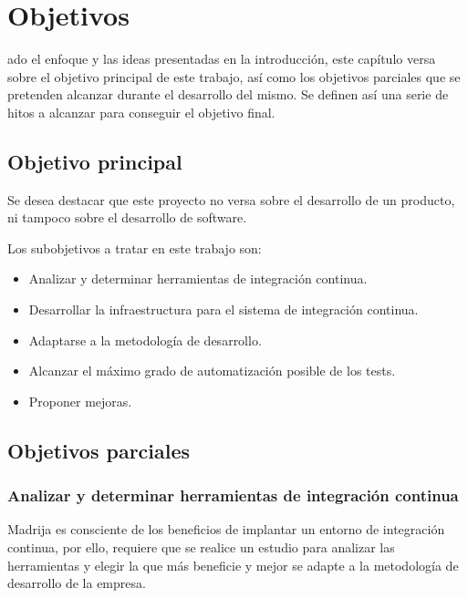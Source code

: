 \chapter{Objetivos}
\label{chap:objetivos}

ado el enfoque y las ideas presentadas en la introducción, este capítulo versa sobre el objetivo principal de este trabajo, así como los objetivos parciales que se pretenden alcanzar durante el desarrollo del mismo. Se definen así una serie de hitos a alcanzar para conseguir el objetivo final.

\section{Objetivo principal}


Se desea destacar que este proyecto no versa sobre el desarrollo de un producto, ni tampoco sobre el desarrollo de software.


Los subobjetivos a tratar en este trabajo son:

\begin{itemize}
\item Analizar y determinar herramientas de integración continua.
\item Desarrollar la infraestructura para el sistema de integración continua.
\item Adaptarse a la metodología de desarrollo.
\item Alcanzar el máximo grado de automatización posible de los tests.
\item Proponer mejoras.
\end{itemize}

\section{Objetivos parciales}

\subsection{Analizar y determinar herramientas de integración continua}
\ac{Madrija} es consciente de los beneficios de implantar un entorno de integración continua, por ello, requiere que se realice un estudio para analizar las herramientas y elegir la que más beneficie y mejor se adapte a la metodología de desarrollo de la empresa.

